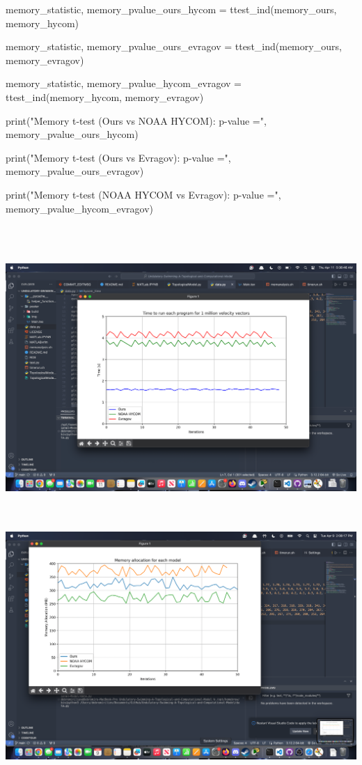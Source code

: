 memory\_statistic, memory\_pvalue\_ours\_hycom =
ttest\_ind(memory\_ours, memory\_hycom)

memory\_statistic, memory\_pvalue\_ours\_evragov =
ttest\_ind(memory\_ours, memory\_evragov)

memory\_statistic, memory\_pvalue\_hycom\_evragov =
ttest\_ind(memory\_hycom, memory\_evragov)

print("Memory t-test (Ours vs NOAA HYCOM): p-value =",
memory\_pvalue\_ours\_hycom)

print("Memory t-test (Ours vs Evragov): p-value =",
memory\_pvalue\_ours\_evragov)

print("Memory t-test (NOAA HYCOM vs Evragov): p-value =",
memory\_pvalue\_hycom\_evragov)



\includegraphics[width=5.88368in,height=3.85635in]{media/image42.png}

\includegraphics[width=6.20296in,height=3.76563in]{media/image44.png}

